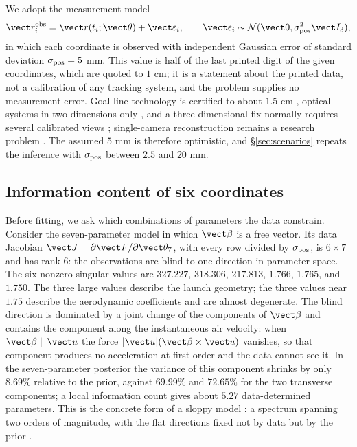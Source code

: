 We adopt the measurement model
\begin{equation}
  \vect r_i^{\rm obs}=\vect r(t_i;\vect\theta)+\vect\varepsilon_i,
  \qquad
  \vect\varepsilon_i\sim\mathcal N(\vect 0,\sigma_{\rm pos}^2\vect I_3),
  \label{eq:noise}
\end{equation}
in which each coordinate is observed with independent Gaussian error of standard
deviation $\sigma_{\rm pos}=5$ mm. This value is half of the last printed digit
of the given coordinates, which are quoted to $1$ cm; it is a statement about the
printed data, not a calibration of any tracking system, and the problem supplies
no measurement error. Goal-line technology is certified to about $1.5$ cm
\citep{fifa2020glt}, optical systems in two dimensions only
\citep{fifa2025epts}, and a three-dimensional fix normally requires several
calibrated views \citep{hawkeye_glt}; single-camera reconstruction remains a
research problem \citep{vorobev2025}. The assumed $5$ mm is therefore
optimistic, and \S\ref{sec:scenarios} repeats the inference with
$\sigma_{\rm pos}$ between $2.5$ and $20$ mm.

\subsection{Information content of six coordinates}
\label{sec:audit}

Before fitting, we ask which combinations of parameters the data constrain.
Consider the seven-parameter model in which $\vect\beta$ is a free vector. Its
data Jacobian $\vect J=\partial\vect F/\partial\vect\theta_7$, with every row
divided by $\sigma_{\rm pos}$, is $6\times7$ and has rank $6$: the observations
are blind to one direction in parameter space. The six nonzero singular values
are $327.227$, $318.306$, $217.813$, $1.766$, $1.765$, and $1.750$. The three
large values describe the launch geometry; the three values near $1.75$ describe
the aerodynamic coefficients and are almost degenerate. The blind direction is
dominated by a joint change of the components of $\vect\beta$ and contains the
component along the instantaneous air velocity: when $\vect\beta\parallel\vect u$
the force $|\vect u|(\vect\beta\times\vect u)$ vanishes, so that component
produces no acceleration at first order and the data cannot see it. In the
seven-parameter posterior the variance of this component shrinks by only
$8.69\%$ relative to the prior, against $69.99\%$ and $72.65\%$ for the two
transverse components; a local information count gives about $5.27$
data-determined parameters. This is the concrete form of a sloppy model
\citep{gutenkunst2007}: a spectrum spanning two orders of magnitude, with the
flat directions fixed not by data but by the prior \citep{white2017}.

